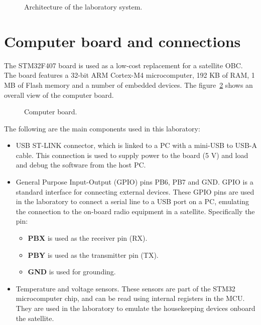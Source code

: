 \begin{figure}[hbtp!]
            \caption{Architecture of the laboratory system.}
            \label{fig:architecture}
\end{figure}

\section*{Computer board and connections}

The STM32F407 board is used as a low-cost replacement for a satellite OBC.
The board features a 32-bit ARM Cortex-M4 microcomputer,
192 KB of RAM, 1 MB of Flash memory and a number of embedded devices.
The figure~\ref{fig:board}
shows an overall view of the computer board.

\begin{figure}[h]
    \caption{Computer board.}
    \label{fig:board}
\end{figure}

The following are the main components used in this laboratory:
\begin{itemize}
\item	USB ST-LINK connector, which is linked to a PC with a mini-USB to USB-A cable. This connection is used to supply power to the board (5 V) and load and debug the software from the host PC.

\item	General Purpose Input-Output (GPIO) pins PB6, PB7 and GND.
GPIO is a standard interface for connecting external devices.
These GPIO pins are used in the laboratory
to connect a serial line to a USB port on a PC,
emulating the connection to the on-board radio equipment in a satellite.
Specifically the pin:
\begin{itemize}
	\item \textbf{PBX} is used as the receiver pin (RX).
	\item \textbf{PBY} is used as the transmitter pin (TX).
	\item \textbf{GND} is used for grounding.
\end{itemize}

\item	Temperature and voltage sensors. These sensors are part of the STM32 microcomputer chip,
and can be read using internal registers in the MCU.
They are used in the laboratory to emulate the housekeeping devices onboard the satellite.
\end{itemize}
